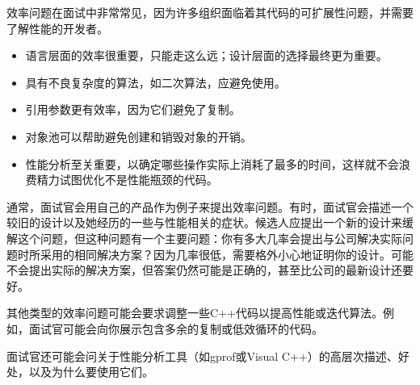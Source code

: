 
效率问题在面试中非常常见，因为许多组织面临着其代码的可扩展性问题，并需要了解性能的开发者。


\begin{itemize}
\item
语言层面的效率很重要，只能走这么远；设计层面的选择最终更为重要。

\item
具有不良复杂度的算法，如二次算法，应避免使用。

\item
引用参数更有效率，因为它们避免了复制。

\item
对象池可以帮助避免创建和销毁对象的开销。

\item
性能分析至关重要，以确定哪些操作实际上消耗了最多的时间，这样就不会浪费精力试图优化不是性能瓶颈的代码。
\end{itemize}


通常，面试官会用自己的产品作为例子来提出效率问题。有时，面试官会描述一个较旧的设计以及她经历的一些与性能相关的症状。候选人应提出一个新的设计来缓解这个问题，但这种问题有一个主要问题：你有多大几率会提出与公司解决实际问题时所采用的相同解决方案？因为几率很低，需要格外小心地证明你的设计。可能不会提出实际的解决方案，但答案仍然可能是正确的，甚至比公司的最新设计还要好。

其他类型的效率问题可能会要求调整一些C++代码以提高性能或迭代算法。例如，面试官可能会向你展示包含多余的复制或低效循环的代码。

面试官还可能会问关于性能分析工具（如gprof或Visual C++）的高层次描述、好处，以及为什么要使用它们。






